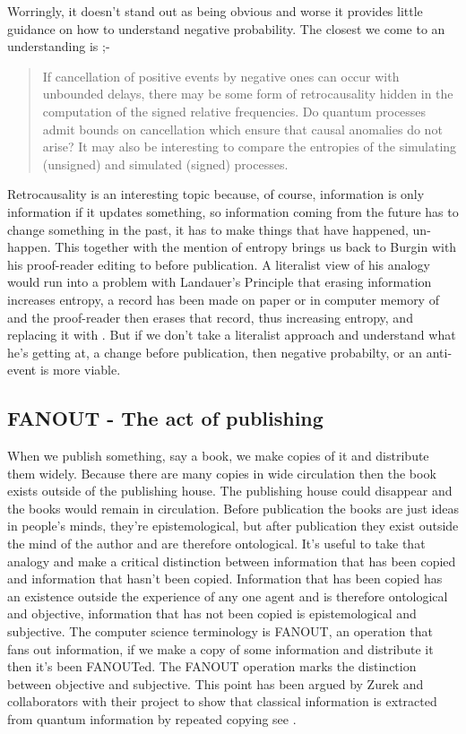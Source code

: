 \documentclass{article}
\begin{document}
Worringly, it doesn't stand out as being obvious and worse it provides little guidance on how to understand negative probability.  The closest we come to an understanding is ;-
\begin{quotation}
    If cancellation of positive events by negative ones can occur with unbounded delays, there may be some form of retrocausality hidden in the computation of the signed relative frequencies. Do quantum processes admit bounds on cancellation which ensure that causal anomalies do not arise? It may also be interesting to compare the entropies of the simulating (unsigned) and simulated (signed) processes.
 \par
\hfill \autocite{Abramsky2014}
\end{quotation}
Retrocausality is an interesting topic because, of course, information is only information if it updates something, so information coming from the future has to change something in the past, it has to make things that have happened, un-happen. This together with the mention of entropy brings us back to Burgin with his proof-reader editing  to  before publication. A literalist view of his analogy would run into a problem with Landauer's Principle \autocite{Landauer_1961} that erasing information increases entropy, a record has been made on paper or in computer memory of  and the proof-reader then erases that record, thus increasing entropy, and replacing it with . But if we don't take a literalist approach and understand what he's getting at, a change before publication, then negative probabilty, or an anti-event is more viable. 
\subsection{FANOUT - The act of publishing}
\label{sec:fanout-boundary}
When we publish something, say a book,  we make copies of it and distribute them widely. Because there are many copies in wide circulation then the book exists outside of the publishing house. The publishing house could disappear and the books would remain in circulation. Before publication the books are just ideas in people's minds, they're epistemological, but after publication they exist outside the mind of the author and are therefore ontological. It's useful to take that analogy and make a critical distinction between information that has been copied and information that hasn't been copied. Information that has been copied has an existence outside the experience of any one agent and is therefore ontological and objective, information that has not been copied is epistemological and subjective. The computer science terminology is FANOUT, an operation that fans out information, if we make a copy of some information and distribute it then it's been FANOUTed. The FANOUT operation marks the distinction between objective and subjective. This point has been argued by Zurek and collaborators with their project to show that classical information is extracted from quantum information by repeated copying see \autocite{zureck_2009, Zurek2002, Oliver_2004}. 
\end{document}
